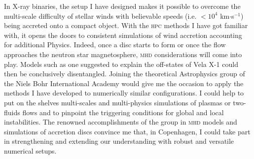 \documentclass[a4paper,12pt,onecolumn]{article}
\begin{document}

\indent In X-ray binaries, the setup I have designed makes it possible to overcome the multi-scale difficulty of stellar winds with believable speeds (i.e. $<10^4$ km$\cdot$s$^{-1}$) being accreted onto a compact object. With the \textsc{hpc} methods I have got familiar with, it opens the doors to consistent simulations of wind accretion accounting for additional Physics. Indeed, once a disc starts to form or once the flow approaches the neutron star magnetosphere, \textsc{mhd} considerations will come into play. Models such as one suggested to explain the off-states of Vela X-1 could then be conclusively disentangled. Joining the theoretical Astrophysics group of the Niels Bohr International Academy would give me the occasion to apply the methods I have developed to numerically similar configurations. I could help to put on the shelves multi-scales and multi-physics simulations of plasmas or two-fluids flows and to pinpoint the triggering conditions for global and local instabilities. The renowned accomplishments of the group in \textsc{mhd} models and simulations of accretion discs convince me that, in Copenhagen, I could take part in strengthening and extending our understanding with robust and versatile numerical setups.
\end{document}
